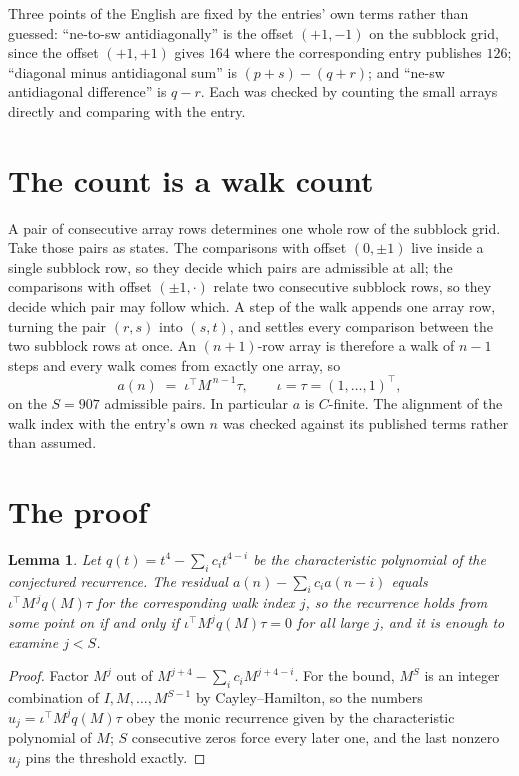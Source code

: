 \documentclass[11pt,a4paper]{article}
\theoremstyle{plain}
\newtheorem{lemma}[theorem]{Lemma}
\theoremstyle{definition}
\begin{document}
Three points of the English are fixed by the entries' own terms rather than guessed:
``ne-to-sw antidiagonally'' is the offset $(+1,-1)$ on the subblock grid, since the offset
$(+1,+1)$ gives $164$ where the corresponding entry publishes $126$; ``diagonal minus
antidiagonal sum'' is $(p+s)-(q+r)$; and ``ne-sw antidiagonal difference'' is $q-r$. Each was
checked by counting the small arrays directly and comparing with the entry.

\section{The count is a walk count}

A pair of consecutive array rows determines one whole row of the subblock grid. Take those
pairs as states. The comparisons with offset $(0,\pm1)$ live inside a single subblock row, so
they decide which pairs are admissible at all; the comparisons with offset $(\pm1,\cdot)$
relate two consecutive subblock rows, so they decide which pair may follow which. A step of the
walk appends one array row, turning the pair $(r,s)$ into $(s,t)$, and settles every comparison
between the two subblock rows at once. An $(n+1)$-row array is therefore a walk of $n-1$ steps
and every walk comes from exactly one array, so
\[
a(n)\;=\;\iota^{\!\top}M^{\,n-1}\tau,\qquad \iota=\tau=(1,\dots,1)^{\!\top},
\]
on the $S=907$ admissible pairs. In particular $a$ is $C$-finite. The alignment of the walk
index with the entry's own $n$ was checked against its published terms rather than assumed.

\section{The proof}

\begin{lemma}\label{lem:crit}
Let $q(t)=t^{4}-\sum_i c_it^{4-i}$ be the characteristic polynomial of the
conjectured recurrence. The residual $a(n)-\sum_ic_ia(n-i)$ equals
$\iota^{\!\top}M^{\,j}q(M)\tau$ for the corresponding walk index $j$, so the recurrence
holds from some point on if and only if $\iota^{\!\top}M^{j}q(M)\tau=0$ for all large $j$,
and it is enough to examine $j<S$.
\end{lemma}

\begin{proof}
Factor $M^{j}$ out of $M^{j+4}-\sum_ic_iM^{j+4-i}$. For the bound, $M^{S}$
is an integer combination of $I,M,\dots,M^{S-1}$ by Cayley--Hamilton, so the numbers
$u_j=\iota^{\!\top}M^{j}q(M)\tau$ obey the monic recurrence given by the characteristic
polynomial of $M$; $S$ consecutive zeros force every later one, and the last nonzero $u_j$
pins the threshold exactly.
\end{proof}
\end{document}
